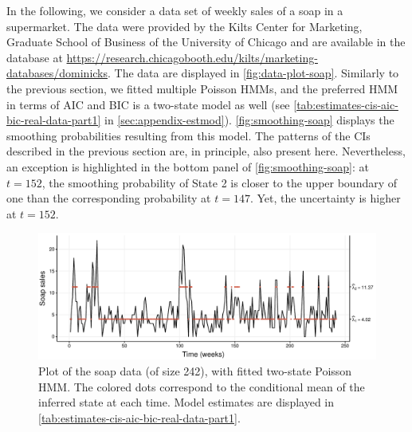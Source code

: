 \documentclass[]{interact}\usepackage[]{graphicx}\usepackage[dvipsnames]{xcolor}
\makeatletter
\def\maxwidth{ %
  \ifdim\Gin@nat@width>\linewidth
    \linewidth
  \else
    \Gin@nat@width
  \fi
}
\newenvironment{knitrout}{}{} %
\theoremstyle{plain}%
\theoremstyle{definition}
\theoremstyle{remark}
\makeatother
\begin{document}
In the following, we consider a data set of weekly sales of a soap in a supermarket. The data were provided by the Kilts Center for Marketing, Graduate School of Business of the University of Chicago and are available in the database at \url{https://research.chicagobooth.edu/kilts/marketing-databases/dominicks}.
The data are displayed in \autoref{fig:data-plot-soap}.
Similarly to the previous section, we fitted multiple Poisson HMMs, and the preferred HMM in terms of AIC and BIC is a two-state model as well (see \autoref{tab:estimates-cis-aic-bic-real-data-part1} in \autoref{sec:appendix-estmod}). \autoref{fig:smoothing-soap} displays the smoothing probabilities resulting from this model.
The patterns of the CIs described in the previous section are, in principle, also present here.
Nevertheless, an exception is highlighted in the bottom panel of \autoref{fig:smoothing-soap}:
at $t = 152$, the smoothing probability of State 2 is closer to the upper boundary of one than the corresponding probability at $t = 147$. Yet, the uncertainty is higher at $t = 152$.




\begin{knitrout}
\color{fgcolor}\begin{figure}[htb]

{\centering \includegraphics[width=\maxwidth]{figure/data-plot-soap-1} 

}

\caption{Plot of the soap data (of size 242), with fitted two-state Poisson HMM. The colored dots correspond to the conditional mean of the inferred state at each time. Model estimates are displayed in \autoref{tab:estimates-cis-aic-bic-real-data-part1}.}\label{fig:data-plot-soap}
\end{figure}

\end{knitrout}
\end{document}
